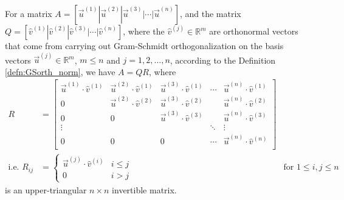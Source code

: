 \begin{proper}
\label{proper:QRdecompose}
For a matrix $A = [\vec{u}^{(1)}|\vec{u}^{(2)}|\vec{u}^{(3)}|\cdots|\vec{u}^{(n)}]$, and the matrix $Q = [\hat{v}^{(1)}|\hat{v}^{(2)}|\hat{v}^{(3)}|\cdots|\hat{v}^{(n)}]$, where the $\hat{v}^{(j)} \in \mathbb{R}^m$ are orthonormal vectors that come from carrying out Gram-Schmidt orthogonalization on the basis vectors $\vec{u}^{(j)} \in \mathbb{R}^m$, $m \leq n$ and $j = 1,2,\ldots,n$, according to the Definition \ref{defn:GSorth_norm}, we have $A = QR$, where
\begin{align}
R &= 
\begin{bmatrix}
\vec{u}^{(1)} \cdot \hat{v}^{(1)} & \vec{u}^{(2)} \cdot \hat{v}^{(1)} & \vec{u}^{(3)} \cdot \hat{v}^{(1)} & \cdots & \vec{u}^{(n)} \cdot \hat{v}^{(1)} \\
0 & \vec{u}^{(2)} \cdot \hat{v}^{(2)} & \vec{u}^{(3)} \cdot \hat{v}^{(2)} &  & \vec{u}^{(n)} \cdot \hat{v}^{(2)} \\
0 & 0 & \vec{u}^{(3)} \cdot \hat{v}^{(3)} &  & \vec{u}^{(n)} \cdot \hat{v}^{(3)} \\
\vdots & & & \ddots & \vdots\\
0 & 0 & 0 & \cdots & \vec{u}^{(n)} \cdot \hat{v}^{(n)} \\
\end{bmatrix} \label{eqn:QRR} \\
\text{i.e. } R_{ij} &= 
\begin{cases}
\vec{u}^{(j)} \cdot \hat{v}^{(i)} & i \leq j \\
0 & i > j
\end{cases}
& \text{for $1 \leq i, j \leq n$} \nonumber
\end{align}
is an upper-triangular $n \times n$ invertible matrix.
\end{proper}
